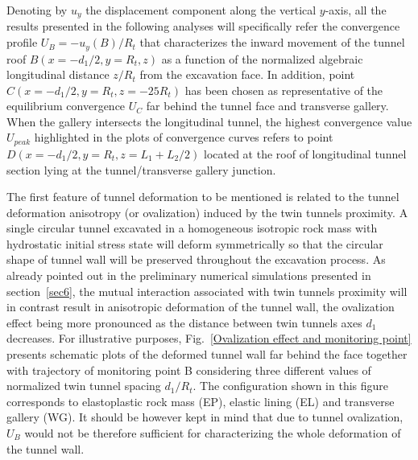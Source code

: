 \documentclass[a4paper,fleqn]{cas-sc}
\begin{document}
Denoting by $u_y$ the displacement component along the vertical  $y$-axis, all the results presented in the following analyses will specifically refer the convergence profile $U_B=-u_y(B)/R_t$ that characterizes the inward movement of the tunnel roof $B(x = -d_1/2, y = R_t, z)$ as a function of the normalized algebraic longitudinal distance $z/R_t$ from the excavation face. In addition, point  $C(x=-d_1/2, y =R_t, z = -25R_t)$ has been chosen as representative of the equilibrium convergence $U_C$ far behind the tunnel face and transverse gallery. When the gallery intersects the longitudinal tunnel, the highest convergence value $U_{peak}$ highlighted in the plots of convergence curves refers to point $D(x=-d_1/2, y = R_t, z = L_1+L_2/2)$ located at the roof of longitudinal tunnel section lying at the tunnel/transverse gallery junction.

The first feature of tunnel deformation to be mentioned is related to the tunnel deformation anisotropy (or ovalization) induced by the twin tunnels proximity. A single circular tunnel excavated in a homogeneous isotropic rock mass with hydrostatic initial stress state will deform symmetrically so that the circular shape of tunnel wall will be preserved throughout the excavation process. As already pointed out in the preliminary numerical simulations presented in section~\ref{sec6}, the mutual interaction associated with twin tunnels proximity will in contrast result in anisotropic deformation of the tunnel wall, the ovalization effect being more pronounced as the distance between twin tunnels axes $d_1$ decreases. For illustrative purposes, Fig.~\ref{Ovalization effect and monitoring point} presents schematic plots of the deformed tunnel wall far behind the face together with trajectory of monitoring point B considering three different values of normalized twin tunnel spacing $d_1/R_t$. The configuration shown in this figure corresponds to elastoplastic rock mass (EP), elastic lining (EL) and transverse gallery (WG). It should be however kept in mind that due to tunnel ovalization, $U_B$ would not be therefore sufficient for characterizing the whole deformation of the tunnel wall.
\end{document}
